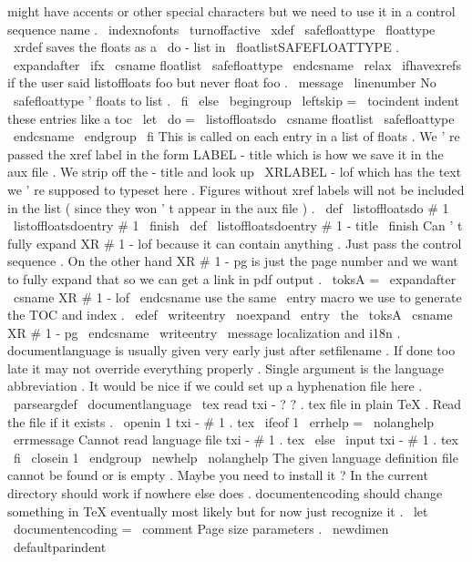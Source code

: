 {{{might
have
accents
or
other
special
characters
%
but
we
need
to
use
it
in
a
control
sequence
name
.
\
indexnofonts
\
turnoffactive
\
xdef
\
safefloattype
{
\
floattype
}
%
}
%
%
%
\
xrdef
saves
the
floats
as
a
\
do
-
list
in
\
floatlistSAFEFLOATTYPE
.
\
expandafter
\
ifx
\
csname
floatlist
\
safefloattype
\
endcsname
\
relax
\
ifhavexrefs
%
if
the
user
said
listoffloats
foo
but
never
float
foo
.
\
message
{
\
linenumber
No
\
safefloattype
'
floats
to
list
.
}
%
\
fi
\
else
\
begingroup
\
leftskip
=
\
tocindent
%
indent
these
entries
like
a
toc
\
let
\
do
=
\
listoffloatsdo
\
csname
floatlist
\
safefloattype
\
endcsname
\
endgroup
\
fi
}
%
This
is
called
on
each
entry
in
a
list
of
floats
.
We
'
re
passed
the
%
xref
label
in
the
form
LABEL
-
title
which
is
how
we
save
it
in
the
%
aux
file
.
We
strip
off
the
-
title
and
look
up
\
XRLABEL
-
lof
which
%
has
the
text
we
'
re
supposed
to
typeset
here
.
%
%
Figures
without
xref
labels
will
not
be
included
in
the
list
(
since
%
they
won
'
t
appear
in
the
aux
file
)
.
%
\
def
\
listoffloatsdo
#
1
{
\
listoffloatsdoentry
#
1
\
finish
}
\
def
\
listoffloatsdoentry
#
1
-
title
\
finish
{
{
%
%
Can
'
t
fully
expand
XR
#
1
-
lof
because
it
can
contain
anything
.
Just
%
pass
the
control
sequence
.
On
the
other
hand
XR
#
1
-
pg
is
just
the
%
page
number
and
we
want
to
fully
expand
that
so
we
can
get
a
link
%
in
pdf
output
.
\
toksA
=
\
expandafter
{
\
csname
XR
#
1
-
lof
\
endcsname
}
%
%
%
use
the
same
\
entry
macro
we
use
to
generate
the
TOC
and
index
.
\
edef
\
writeentry
{
\
noexpand
\
entry
{
\
the
\
toksA
}
{
\
csname
XR
#
1
-
pg
\
endcsname
}
}
%
\
writeentry
}
}
\
message
{
localization
}
%
and
i18n
.
%
documentlanguage
is
usually
given
very
early
just
after
%
setfilename
.
If
done
too
late
it
may
not
override
everything
%
properly
.
Single
argument
is
the
language
abbreviation
.
%
It
would
be
nice
if
we
could
set
up
a
hyphenation
file
here
.
%
\
parseargdef
\
documentlanguage
{
%
\
tex
%
read
txi
-
?
?
.
tex
file
in
plain
TeX
.
%
Read
the
file
if
it
exists
.
\
openin
1
txi
-
#
1
.
tex
\
ifeof
1
\
errhelp
=
\
nolanghelp
\
errmessage
{
Cannot
read
language
file
txi
-
#
1
.
tex
}
%
\
else
\
input
txi
-
#
1
.
tex
\
fi
\
closein
1
\
endgroup
}
\
newhelp
\
nolanghelp
{
The
given
language
definition
file
cannot
be
found
or
is
empty
.
Maybe
you
need
to
install
it
?
In
the
current
directory
should
work
if
nowhere
else
does
.
}
%
documentencoding
should
change
something
in
TeX
eventually
most
%
likely
but
for
now
just
recognize
it
.
\
let
\
documentencoding
=
\
comment
%
Page
size
parameters
.
%
\
newdimen
\
defaultparindent
}
